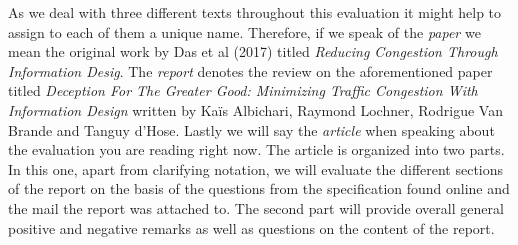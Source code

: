 \documentclass[../review.tex]{subfiles}
\begin{document}
As we deal with three different texts throughout this evaluation it might help to assign to each of them a unique name. Therefore, if we speak of the  \textit{paper} we mean the original work by Das et al (2017) titled \textit{Reducing Congestion Through Information Desig}. The \textit{report} denotes the review on the aforementioned paper titled \textit{Deception For The Greater Good: Minimizing Traffic Congestion With Information Design} written by Ka\"{i}s Albichari, Raymond Lochner, Rodrigue Van Brande and Tanguy d'Hose. Lastly we will say the \textit{article} when speaking about the evaluation you are reading right now. The article is organized into two parts. In this one, apart from clarifying notation, we will evaluate the different sections of the report on the basis of the questions from the specification found online and the mail the report was attached to. The second part will provide overall general positive and negative remarks as well as questions on the content of the report.
\end{document}
